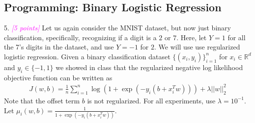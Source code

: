 \documentclass{article}
\newcommand{\field}[1]{\mathbb{#1}}
\newcommand{\1}{\mathbf{1}}
\newcommand{\R}{\field{R}} %
\newcommand{\grade}[1]{\small\textcolor{magenta}{\emph{[#1 points]}} \normalsize}
\begin{document}
\subsection{Programming: Binary Logistic Regression}

5. \grade{5} Let us again consider the MNIST dataset, but now just binary classification, specifically, recognizing if a digit is a $2$ or $7$.
Here, let $Y=1$ for all the 7's digits in the dataset, and use $Y=-1$ for $2$.
We will use use regularized logistic regression. 
Given a binary classification dataset $\{(x_i,y_i)\}_{i=1}^n$ for $x_i \in \R^d$ and $y_i \in \{-1,1\}$ we showed in class that the regularized negative log likelihood objective function can be written as
\begin{align*}
J(w,b) = \frac{1}{n} \sum_{i=1}^n \log( 1 + \exp(-y_i (b + x_i^T w))) + \lambda ||w||_2^2
\end{align*} 
Note that the offset term $b$ is not regularized. 
For all experiments, use $\lambda = 10^{-1}$. 
Let $\mu_i(w,b) = \frac{1}{1+ \exp(-y_i (b + x_i^T w))}$. 
\end{document}
